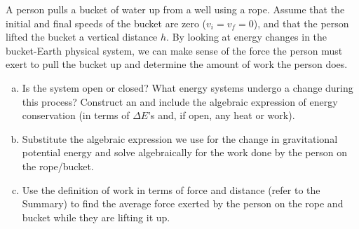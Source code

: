 \label{fnt2.1.1-2}

A person pulls a bucket of water up from a well using a rope. Assume that the initial and final speeds of the bucket are zero ($v_i=v_f=0$), and that the person lifted the bucket a vertical distance $h$. By looking at energy changes in the bucket-Earth physical system, we can make sense of the force the person must exert to pull the bucket up and determine the amount of work the person does.

\begin{enumerate}[(a)]
	\item Is the system open or closed? What energy systems undergo a change during this process? Construct an \EnergyDiagram{} and include the algebraic expression of energy conservation (in terms of $\Delta E$'s and, if open, any heat or work).
	
	\item Substitute the algebraic expression we use for the change in gravitational potential energy and solve algebraically for the work done by the person on the rope/bucket.
	
	\item Use the definition of work in terms of force and distance (refer to the \EnergyInteractionModel{} Summary) to find the average force exerted by the person on the rope and bucket while they are lifting it up.
\end{enumerate}

